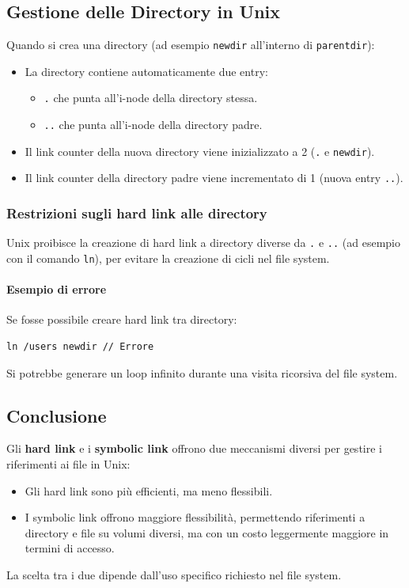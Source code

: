 \subsection{Gestione delle Directory in Unix}
Quando si crea una directory (ad esempio \texttt{newdir} all'interno di \texttt{parentdir}):
\begin{itemize}
    \item La directory contiene automaticamente due entry:
    \begin{itemize}
        \item \texttt{.} che punta all'i-node della directory stessa.
        \item \texttt{..} che punta all'i-node della directory padre.
    \end{itemize}
    \item Il link counter della nuova directory viene inizializzato a 2 (\texttt{.} e \texttt{newdir}).
    \item Il link counter della directory padre viene incrementato di 1 (nuova entry \texttt{..}).
\end{itemize}

\subsubsection{Restrizioni sugli hard link alle directory}
Unix proibisce la creazione di hard link a directory diverse da \texttt{.} e \texttt{..} (ad esempio con il comando \texttt{ln}), per evitare la creazione di cicli nel file system. 

\paragraph{Esempio di errore}
Se fosse possibile creare hard link tra directory:
\begin{verbatim}
ln /users newdir // Errore
\end{verbatim}
Si potrebbe generare un loop infinito durante una visita ricorsiva del file system.

\subsection{Conclusione}
Gli \textbf{hard link} e i \textbf{symbolic link} offrono due meccanismi diversi per gestire i riferimenti ai file in Unix:
\begin{itemize}
    \item Gli hard link sono più efficienti, ma meno flessibili.
    \item I symbolic link offrono maggiore flessibilità, permettendo riferimenti a directory e file su volumi diversi, ma con un costo leggermente maggiore in termini di accesso.
\end{itemize}
La scelta tra i due dipende dall'uso specifico richiesto nel file system.

